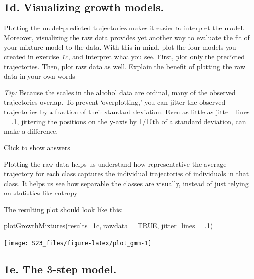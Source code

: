 \documentclass[
]{book}
\newenvironment{Shaded}{\begin{snugshade}}{\end{snugshade}}
\newcommand{\AttributeTok}[1]{\textcolor[rgb]{0.77,0.63,0.00}{#1}}
\newcommand{\ConstantTok}[1]{\textcolor[rgb]{0.00,0.00,0.00}{#1}}
\newcommand{\DecValTok}[1]{\textcolor[rgb]{0.00,0.00,0.81}{#1}}
\newcommand{\FunctionTok}[1]{\textcolor[rgb]{0.00,0.00,0.00}{#1}}
\newcommand{\NormalTok}[1]{#1}
\begin{document}
\hypertarget{d.-visualizing-growth-models.}{%
\subsection{1d. Visualizing growth models.}\label{d.-visualizing-growth-models.}}

Plotting the model-predicted trajectories makes it easier to interpret the model. Moreover, visualizing the raw data provides yet another way to evaluate the fit of your mixture model to the data. With this in mind, plot the four models you created in exercise \emph{1c}, and interpret what you see. First, plot only the predicted trajectories. Then, plot raw data as well. Explain the benefit of plotting the raw data in your own words.

\textit{Tip:} Because the scales in the alcohol data are ordinal, many of the observed trajectories overlap. To prevent `overplotting,' you can jitter the observed trajectories by a fraction of their standard deviation. Even as little as jitter\_lines = .1, jittering the positions on the y-axis by 1/10th of a standard deviation, can make a difference.

Click to show answers

Plotting the raw data helps us understand how representative the average trajectory for each class captures the individual trajectories of individuals in that class. It helps us see how separable the classes are visually, instead of just relying on statistics like entropy.

The resulting plot should look like this:

\begin{Shaded}
\begin{Highlighting}[]
\FunctionTok{plotGrowthMixtures}\NormalTok{(results\_1c, }\AttributeTok{rawdata =} \ConstantTok{TRUE}\NormalTok{, }\AttributeTok{jitter\_lines =}\NormalTok{ .}\DecValTok{1}\NormalTok{)}
\end{Highlighting}
\end{Shaded}

\begin{center}\texttt{[image: S23\_files/figure-latex/plot\_gmm-1]} \end{center}

\hypertarget{e.-the-3-step-model.}{%
\subsection{1e. The 3-step model.}\label{e.-the-3-step-model.}}
\end{document}

